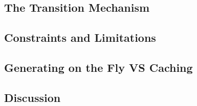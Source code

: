 \subsection{The Transition Mechanism}

\subsection{Constraints and Limitations}
\subsection{Generating on the Fly VS Caching}

\subsection{Discussion}



